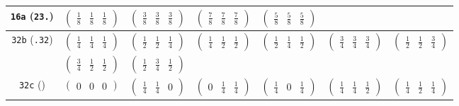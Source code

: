 \documentclass[fleqn,9pt,landscape]{jsarticle}
\begin{document}
\begin{center}
\begin{longtable}{ccccccc}
{\tt 16a} ({\tt 23.}) & $ \begin{pmatrix} \frac{1}{8} & \frac{1}{8} & \frac{1}{8} \end{pmatrix} $ & $ \begin{pmatrix} \frac{3}{8} & \frac{3}{8} & \frac{3}{8} \end{pmatrix} $ & $ \begin{pmatrix} \frac{7}{8} & \frac{7}{8} & \frac{7}{8} \end{pmatrix} $ & $ \begin{pmatrix} \frac{5}{8} & \frac{5}{8} & \frac{5}{8} \end{pmatrix} $ & $  $ & $  $ \\ \hline
{\tt 32b} ({\tt .32}) & $ \begin{pmatrix} \frac{1}{4} & \frac{1}{4} & \frac{1}{4} \end{pmatrix} $ & $ \begin{pmatrix} \frac{1}{2} & \frac{1}{2} & \frac{1}{4} \end{pmatrix} $ & $ \begin{pmatrix} \frac{1}{4} & \frac{1}{2} & \frac{1}{2} \end{pmatrix} $ & $ \begin{pmatrix} \frac{1}{2} & \frac{1}{4} & \frac{1}{2} \end{pmatrix} $ & $ \begin{pmatrix} \frac{3}{4} & \frac{3}{4} & \frac{3}{4} \end{pmatrix} $ & $ \begin{pmatrix} \frac{1}{2} & \frac{1}{2} & \frac{3}{4} \end{pmatrix} $ \\
& $ \begin{pmatrix} \frac{3}{4} & \frac{1}{2} & \frac{1}{2} \end{pmatrix} $ & $ \begin{pmatrix} \frac{1}{2} & \frac{3}{4} & \frac{1}{2} \end{pmatrix} $ & $  $ & $  $ & $  $ & $  $ \\ \hline
{\tt 32c} ({\tt }) & $ \begin{pmatrix} 0 & 0 & 0 \end{pmatrix} $ & $ \begin{pmatrix} \frac{1}{4} & \frac{1}{4} & 0 \end{pmatrix} $ & $ \begin{pmatrix} 0 & \frac{1}{4} & \frac{1}{4} \end{pmatrix} $ & $ \begin{pmatrix} \frac{1}{4} & 0 & \frac{1}{4} \end{pmatrix} $ & $ \begin{pmatrix} \frac{1}{4} & \frac{1}{4} & \frac{1}{2} \end{pmatrix} $ & $ \begin{pmatrix} \frac{1}{4} & \frac{1}{2} & \frac{1}{4} \end{pmatrix} $ \\

\end{longtable}
\end{center}
\end{document}
